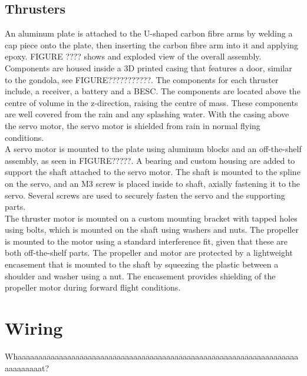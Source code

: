 \documentclass[../main.tex]{subfiles}
\begin{document}
\subsection{Thrusters}
An aluminum plate is attached to the U-shaped carbon fibre arms by welding a cap piece onto the plate, then inserting the carbon fibre arm into it and applying epoxy. FIGURE ???? shows and exploded view of the overall assembly. Components are housed inside a 3D printed casing that features a door, similar to the gondola, see FIGURE???????????. The components for each thruster include, a receiver, a battery and a BESC. The components are located above the centre of volume in the z-direction, raising the centre of mass. These components are well covered from the rain and any splashing water. With the casing above the servo motor, the servo motor is shielded from rain in normal flying conditions.\\

 A servo motor is mounted to the plate using aluminum blocks and an off-the-shelf assembly, as seen in FIGURE?????. A bearing and custom housing are added to support the shaft attached to the servo motor. The shaft is mounted to the spline on the servo, and an M3 screw is placed inside to shaft, axially fastening it to the servo. Several screws are used to securely fasten the servo and the supporting parts.\\

The thruster motor is mounted on a custom mounting bracket with tapped holes using bolts, which is mounted on the shaft using washers and nuts. The propeller is mounted to the motor using a standard interference fit, given that these are both off-the-shelf parts. The propeller and motor are protected by a lightweight encasement that is mounted to the shaft by squeezing the plastic between a shoulder and washer using a nut. The encasement provides shielding of the propeller motor during forward flight conditions.\\

\section{Wiring}
Whaaaaaaaaaaaaaaaaaaaaaaaaaaaaaaaaaaaaaaaaaaaaaaaaaaaaaaaaaaaaaaaaaaaaaaaaaaaaat?
\end{document}
